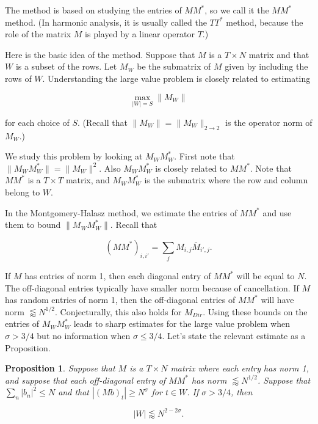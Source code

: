 \documentclass{amsart}
\newtheorem{prop}{Proposition}[section]
\begin{document}
The method is based on studying the entries of $M M^*$, so we call it the $M M^*$ method.  (In harmonic analysis, it is usually called the $T T^*$ method, because the role of the matrix $M$ is played by a linear operator $T$.)

Here is the basic idea of the method.   Suppose that $M$ is a $T \times N$ matrix and that $W$ is a subset of the rows.   Let $M_W$ be the submatrix of $M$ given by including the rows of $W$.    Understanding the large value problem is closely related to estimating

$$ \max_{|W| = S} \| M_W \| $$

\noindent for each choice of $S$.   (Recall that $\| M_W \| = \| M_W \|_{2 \rightarrow 2}$ is the operator norm of $M_W$.)

We study this problem by looking at $M_W M_W^*$.   First note that $\| M_W M_W^* \| = \| M_W \|^2$.   Also $M_W M_W^*$ is closely related to $M M^*$.   Note that $M M^*$ is a $T \times T$ matrix, and $M_W M_W^*$ is the submatrix where the row and column belong to $W$.   

In the Montgomery-Halasz method,  we estimate the entries of $M M^*$ and use them to bound $\| M_W M_W^* \|$.    Recall that 

$$(M M^*)_{i, i'} = \sum_j M_{i,j} \bar M_{i',j}. $$

\noindent If $M$ has entries of norm 1,  then each diagonal entry of $M M^*$ will be equal to $N$.   The off-diagonal entries typically have smaller norm because of cancellation.   If $M$ has random entries of norm 1,  then the off-diagonal entries of $M M^*$ will have norm $\lessapprox N^{1/2}$.  Conjecturally,  this also holds for $M_{Dir}$.   Using these bounds on the entries of $M_W M_W^*$ leads to sharp estimates for the large value problem when $\sigma > 3/4$ but no information when $\sigma \le 3/4$.   Let's state the relevant estimate as a Proposition.

\begin{prop} Suppose that $M$ is a $T \times N$ matrix where each entry has norm 1,  and suppose that each off-diagonal entry of $M M^*$ has norm $\lessapprox N^{1/2}$.   Suppose that $\sum_n |b_n|^2 \le N$ and that $|(Mb)_t| \ge N^\sigma$ for $t \in W$.   If $\sigma > 3/4$,  then

$$ |W| \lessapprox N^{2 - 2 \sigma}. $$


\end{prop}
\end{document}
